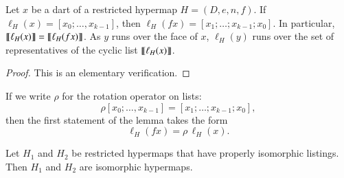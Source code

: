 \begin{lemma}\label{lemma:f-equi}
  Let $x$ be a dart of a restricted hypermap $H=(D,e,n,f)$.  If
  $\ell_H(x) = [x_0;\ldots,x_{k-1}]$, then $\ell_H(f x) =
  [x_1;\ldots;x_{k-1};x_0]$.  In particular,
  ${\llbracket{\ell_H(x)}\rrbracket}={\llbracket{\ell_H(f x)}\rrbracket}$.  As $y$ runs over the face of
  $x$, $\ell_H(y)$ runs over the set of representatives of the cyclic
  list ${\llbracket{\ell_H(x)}\rrbracket}$.
\end{lemma}

\begin{proof} This is an elementary verification.
\end{proof}

If we write $\rho$ for the rotation operator on lists:
\[
\rho  [x_0;\ldots,x_{k-1}]= [x_1;\ldots;x_{k-1};x_0],
\]
then the first statement of the lemma takes the form
\[
 \ell_H(f x) = \rho\, \ell_H(x).
\]

\begin{lemma}\label{lemma:pr-iso} 
  Let $H_1$ and $H_2$ be restricted hypermaps that have properly
  isomorphic listings.  Then $H_1$ and $H_2$ are isomorphic hypermaps.
\end{lemma}

